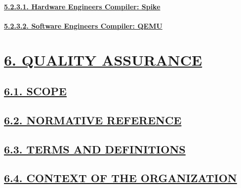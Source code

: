 \documentclass[
]{article}
\begin{document}
\hypertarget{hardware-engineers-compiler-spike}{%
\paragraph{\texorpdfstring{\protect\hyperlink{hardware-engineers-compiler-spike-1}{5.2.3.1.
Hardware Engineers Compiler:
Spike}}{5.2.3.1. Hardware Engineers Compiler: Spike}}\label{hardware-engineers-compiler-spike}}

\hypertarget{software-engineers-compiler-qemu}{%
\paragraph{\texorpdfstring{\protect\hyperlink{software-engineers-compiler-qemu-1}{5.2.3.2.
Software Engineers Compiler:
QEMU}}{5.2.3.2. Software Engineers Compiler: QEMU}}\label{software-engineers-compiler-qemu}}

\hypertarget{quality-assurance}{%
\section{\texorpdfstring{\protect\hyperlink{quality-assurance-1}{6.
QUALITY ASSURANCE}}{6. QUALITY ASSURANCE}}\label{quality-assurance}}

\hypertarget{scope}{%
\subsection{\texorpdfstring{\protect\hyperlink{scope-1}{6.1.
SCOPE}}{6.1. SCOPE}}\label{scope}}

\hypertarget{normative-reference}{%
\subsection{\texorpdfstring{\protect\hyperlink{normative-reference-1}{6.2.
NORMATIVE
REFERENCE}}{6.2. NORMATIVE REFERENCE}}\label{normative-reference}}

\hypertarget{terms-and-definitions}{%
\subsection{\texorpdfstring{\protect\hyperlink{terms-and-definitions-1}{6.3.
TERMS AND
DEFINITIONS}}{6.3. TERMS AND DEFINITIONS}}\label{terms-and-definitions}}

\hypertarget{context-of-the-organization}{%
\subsection{\texorpdfstring{\protect\hyperlink{context-of-the-organization-1}{6.4.
CONTEXT OF THE
ORGANIZATION}}{6.4. CONTEXT OF THE ORGANIZATION}}\label{context-of-the-organization}}
\end{document}
